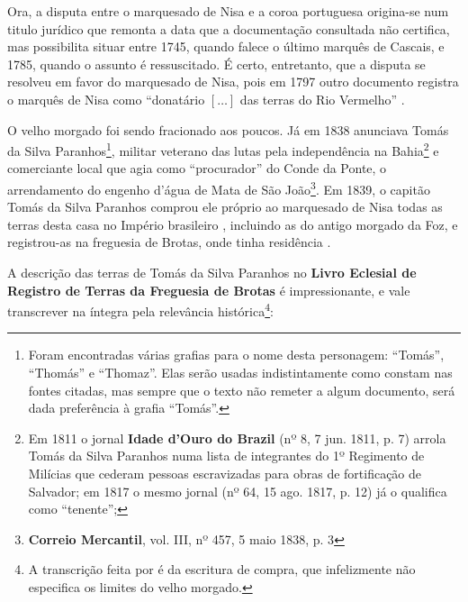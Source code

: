 Ora, a disputa entre o marquesado de Nisa e a coroa portuguesa origina-se num titulo jurídico que remonta a data que a documentação consultada não certifica, mas possibilita situar entre 1745, quando falece o último marquês de Cascais, e 1785, quando o assunto é ressuscitado. É certo, entretanto, que a disputa se resolveu em favor do marquesado de Nisa, pois em 1797 outro documento registra o marquês de Nisa como ``donatário \([\dots]\) das terras do Rio Vermelho'' \cite[p.~543]{ramiz_expos_1881}.

O velho morgado foi sendo fracionado aos poucos. Já em 1838 anunciava Tomás da Silva Paranhos\footnote{Foram encontradas várias grafias para o nome desta personagem: ``Tomás'', ``Thomás'' e ``Thomaz''. Elas serão usadas indistintamente como constam nas fontes citadas, mas sempre que o texto não remeter a algum documento, será dada preferência à grafia ``Tomás''.}, militar veterano das lutas pela independência na Bahia\footnote{Em 1811 o jornal \textbf{Idade d'Ouro do Brazil} (nº 8, 7 jun. 1811, p. 7) arrola Tomás da Silva Paranhos numa lista de integrantes do 1º Regimento de Milícias que cederam pessoas escravizadas para obras de fortificação de Salvador; em 1817 o mesmo jornal (nº 64, 15 ago. 1817, p. 12) já o qualifica como ``tenente''; } e comerciante local que agia como ``procurador'' do Conde da Ponte, o arrendamento do engenho d'água de Mata de São João\footnote{\textbf{Correio Mercantil}, vol. III, nº 457, 5 maio 1838, p. 3}. Em 1839, o capitão Tomás da Silva Paranhos comprou ele próprio ao marquesado de Nisa todas as terras desta casa no Império brasileiro \cite[pp.~III-7 - III-12]{teixeira_doacoes_1978}, incluindo as do antigo morgado da Foz, e registrou-as na freguesia de Brotas, onde tinha residência \cite[p.~10]{ott_engenhos_1996}.

A descrição das terras de Tomás da Silva Paranhos no \textbf{Livro Eclesial de Registro de Terras da Freguesia de Brotas} é impressionante, e vale transcrever na íntegra pela relevância histórica\footnote{A transcrição feita por  é da escritura de compra, que infelizmente não especifica os limites do velho morgado.}:

